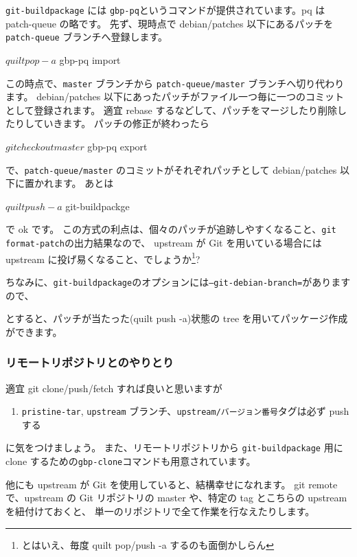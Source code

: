 \documentclass[mingoth,a4paper]{jsarticle}
\begin{document}
{\tt{git-buildpackage}} には {\tt{gbp-pq}}というコマンドが提供されています。pq は patch-queue の略です。
先ず、現時点で debian/patches 以下にあるパッチを {\tt{patch-queue}} ブランチへ登録します。
\begin{commandline}
 $ quilt pop -a
 $ gbp-pq import
\end{commandline}
この時点で、{\tt{master}} ブランチから {\tt{patch-queue/master}} ブランチへ切り代わります。
debian/patches 以下にあったパッチがファイル一つ毎に一つのコミットとして登録されます。
適宜 rebase するなどして、パッチをマージしたり削除したりしていきます。
パッチの修正が終わったら
\begin{commandline}
 $ git checkout master
 $ gbp-pq export
\end{commandline}
で、{\tt{patch-queue/master}} のコミットがそれぞれパッチとして debian/patches 以下に置かれます。
あとは
\begin{commandline}
 $ quilt push -a
 $ git-buildpackge
\end{commandline}
で ok です。
この方式の利点は、個々のパッチが追跡しやすくなること、{\tt{git format-patch}}の出力結果なので、
upstream が Git を用いている場合には upstream に投げ易くなること、でしょうか\footnote{とはいえ、毎度 quilt pop/push -a するのも面倒かしらん}?

ちなみに、{\tt{git-buildpackage}}のオプションには{\tt{--git-debian-branch=}}がありますので、
とすると、パッチが当たった(quilt push -a)状態の tree を用いてパッケージ作成ができます。

\subsubsection{リモートリポジトリとのやりとり}

適宜 git clone/push/fetch すれば良いと思いますが
\begin{enumerate}
\item {\tt{pristine-tar}}, {\tt{upstream}} ブランチ、{\tt{upstream/バージョン番号}}タグは必ず push する
\end{enumerate}
に気をつけましょう。
また、リモートリポジトリから
{\tt{git-buildpackage}} 用に clone するための{\tt{gbp-clone}}コマンドも用意されています。

他にも upstream が Git を使用していると、結構幸せになれます。
git remote で、upstream の Git リポジトリの master や、特定の tag とこちらの upstream を紐付けておくと、
単一のリポジトリで全て作業を行なえたりします。
\end{document}
